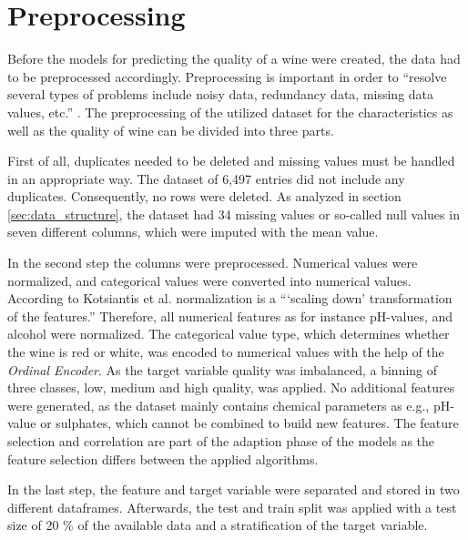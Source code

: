\section{Preprocessing}\label{chap:preprocessing}
Before the models for predicting the quality of a wine were created, the data had to be preprocessed accordingly. Preprocessing is important in order to \enquote{resolve several types of problems include noisy data, redundancy data, missing data values, etc.} \citep[p. 116]{Kotsiantis2006}. The preprocessing of the utilized dataset for the characteristics as well as the quality of wine can be divided into three parts.

First of all, duplicates needed to be deleted and missing values must be handled in an appropriate way. The dataset of 6,497 entries did not include any duplicates. Consequently, no rows were deleted. As analyzed in section \ref{sec:data_structure}, the dataset had 34 missing values or so-called null values in seven different columns, which were imputed with the mean value.

In the second step the columns were preprocessed. Numerical values were normalized, and categorical values were converted into numerical values. According to Kotsiantis et al. normalization is a \enquote{\enquote{scaling down} transformation of the features.} \citep[p. 113]{Kotsiantis2006} Therefore, all numerical features as for instance pH-values, and alcohol were normalized. The categorical value type, which determines whether the wine is red or white, was encoded to numerical values with the help of the \textit{Ordinal Encoder}. \citep{OrdinalEncoder2021} As the target variable quality was imbalanced, a binning of three classes, low, medium and high quality, was applied. No additional features were generated, as the dataset mainly contains chemical parameters as e.g., pH-value or sulphates, which cannot be combined to build new features. The feature selection and correlation are part of the adaption phase of the models as the feature selection differs between the applied algorithms.

In the last step, the feature and target variable were separated and stored in two different dataframes. Afterwards, the test and train split was applied with a test size of 20 \% of the available data and a stratification of the target variable. 



